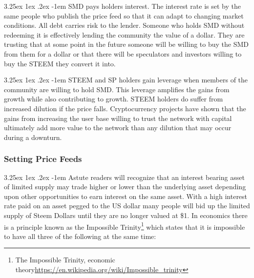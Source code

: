 \documentclass{article}
\makeatletter
\renewcommand\paragraph{\@startsection{paragraph}{5}{\z@}%
  {3.25ex \@plus1ex \@minus.2ex}%
  {-1em}%
  {\normalfont\normalsize\bfseries}}
\makeatother
\begin{document}
                \paragraph{}
                    SMD pays holders interest. The interest rate is set by the same people who publish the price feed so that it can adapt to changing market conditions. All debt carries risk to the lender. Someone who holds SMD without redeeming it is effectively lending the community the value of a dollar. They are trusting that at some point in the future someone will be willing to buy the SMD from them for a dollar or that there will be speculators and investors willing to buy the STEEM they convert it into.

                \paragraph{}
                    STEEM and SP holders gain leverage when members of the community are willing to hold SMD. This leverage amplifies the gains from growth while also contributing to growth. STEEM holders do suffer from increased dilution if the price falls. Cryptocurrency projects have shown that the gains from increasing the user base willing to trust the network with capital ultimately add more value to the network than any dilution that may occur during a downturn.

            \subsubsection{Setting Price Feeds}

                \paragraph{}
                    Astute readers will recognize that an interest bearing asset of limited supply may trade higher or lower than the underlying asset depending upon other opportunities to earn interest on the same asset. With a high interest rate paid on an asset pegged to the US dollar many people will bid up the limited supply of Steem Dollars until they are no longer valued at \$1. In economics there is a principle known as the Impossible Trinity\footnote{The Impossible Trinity, economic theory\newline\url{https://en.wikipedia.org/wiki/Impossible_trinity}} which states that it is impossible to have all three of the following at the same time:
\end{document}
